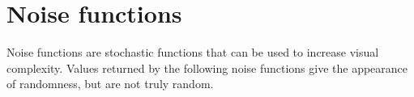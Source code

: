 \hypertarget{group__core__func__noise}{\section{\-Noise functions}
\label{group__core__func__noise}
}
\-Noise functions are stochastic functions that can be used to increase visual complexity. \-Values returned by the following noise functions give the appearance of randomness, but are not truly random. 